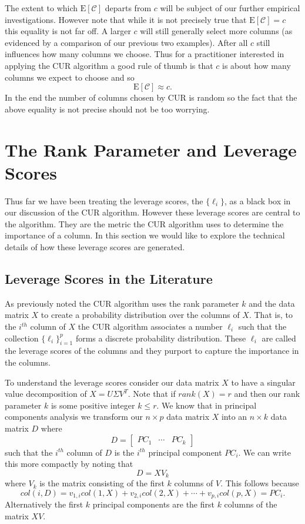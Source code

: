 \documentclass{book}
\begin{document}
The extent to which $\text{E}\left[\mathscr{C}\right]$ departs from $c$ will be subject of our further empirical investigations. However note that while it is not precisely true that $\text{E}\left[\mathscr{C}\right]=c$ this equality is not far off. A larger $c$ will still generally select more columns (as evidenced by a comparison of our previous two examples). After all $c$ still influences how many columns we choose. Thus for a practitioner interested in applying the CUR algorithm a good rule of thumb is that $c$ is about how many columns we expect to choose and so 
$$
\text{E}\left[\mathscr{C}\right]\approx c.
$$
In the end the number of columns chosen by CUR is random so the fact that the above equality is not precise should not be too worrying. 


\section{The Rank Parameter and Leverage Scores}

Thus far we have been treating the leverage scores, the $\{\ell_i\}$, as a black box in our discussion of the CUR algorithm. However these leverage scores are central to the algorithm. They are the metric the CUR algorithm uses to determine the importance of a column. In this section we would like to explore the technical details of how these leverage scores are generated. 

\subsection{Leverage Scores in the Literature}

As previously noted the CUR algorithm uses the rank parameter $k$ and the data matrix $X$ to create a probability distribution over the columns of $X$. That is, to the $i^{th}$ column of $X$ the CUR algorithm associates a number $\ell_i$ such that the collection $\{\ell_i\}_{i=1}^p$ forms a discrete probability distribution. These $\ell_i$ are called the leverage scores of the columns and they purport to capture the importance in the columns. 

To understand the leverage scores consider our data matrix $X$ to have a singular value decomposition of $X=U\Sigma V^T$. Note that if $rank(X)=r$ and then our rank parameter $k$ is some positive integer $k\leq r$. We know that in principal components analysis we transform our $n \times p$ data matrix $X$ into an $n \times k$ data matrix $D$ where 
$$
D=\begin{bmatrix}PC_1& \cdots& PC_k\end{bmatrix}
$$
such that the $i^{th}$ column of $D$ is the $i^{th}$ principal component $PC_i$. We can write this more compactly by noting that 
$$
D=XV_k
$$
where $V_k$ is the matrix consisting of the first $k$ columns of $V$. This follows because 
$$
col(i,D)=v_{1,i}col(1,X)+v_{2,i}col(2,X)+\cdots+v_{p,i}col(p,X)=PC_i.
$$ 
Alternatively the first $k$ principal components are the first $k$ columns of the matrix $XV$.
\end{document}
